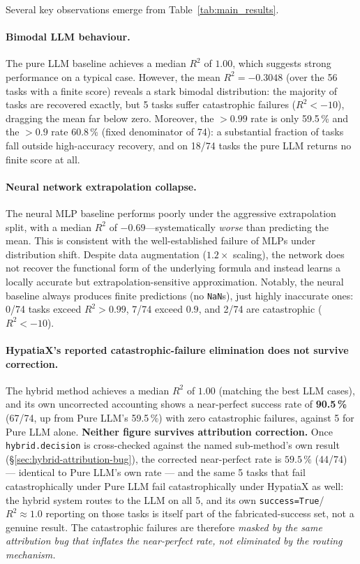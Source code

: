 \documentclass[twoside,11pt]{article}
\newcommand{\Rsq}{R^{2}}
\begin{document}
Several key observations emerge from Table~\ref{tab:main_results}.

\paragraph{Bimodal LLM behaviour.}
The pure LLM baseline achieves a median $\Rsq$ of $1.00$, which suggests strong
performance on a typical case.  However, the mean $\Rsq = -0.3048$ (over the 56 tasks with a finite score) reveals a
stark bimodal distribution: the majority of tasks are recovered exactly, but
5 tasks suffer catastrophic failures ($\Rsq < -10$), dragging the mean far below
zero.  Moreover, the $>0.99$ rate is only 59.5\,\% and the $>0.9$ rate 60.8\,\% (fixed
denominator of 74): a substantial fraction of tasks fall outside high-accuracy
recovery, and on 18/74 tasks the pure LLM returns no finite score at all.

\paragraph{Neural network extrapolation collapse.}
The neural MLP baseline performs poorly under the aggressive extrapolation split,
with a median $\Rsq$ of $-0.69$---systematically \emph{worse} than predicting
the mean.  This is consistent with the well-established failure of MLPs under
distribution shift.  Despite data augmentation ($1.2\times$ scaling), the network
does not recover the functional form of the underlying formula and instead learns
a locally accurate but extrapolation-sensitive approximation.  Notably, the neural
baseline always produces finite predictions (no \texttt{NaN}s), just highly
inaccurate ones: 0/74 tasks exceed $\Rsq>0.99$, 7/74 exceed $0.9$, and 2/74 are
catastrophic ($\Rsq<-10$).

\paragraph{HypatiaX's reported catastrophic-failure elimination does not survive
correction.} The hybrid method achieves a median $\Rsq$ of $1.00$ (matching the
best LLM cases), and its own uncorrected accounting shows a near-perfect success
rate of \textbf{90.5\,\%} (67/74, up from Pure LLM's 59.5\,\%) with zero
catastrophic failures, against 5 for Pure LLM alone. \textbf{Neither figure
survives attribution correction.} Once \texttt{hybrid.decision} is
cross-checked against the named sub-method's own result
(\S\ref{sec:hybrid-attribution-bug}), the corrected near-perfect rate is
$59.5\,\%$ (44/74) --- identical to Pure LLM's own rate --- and the same 5
tasks that fail catastrophically under Pure LLM fail catastrophically under
HypatiaX as well: the hybrid system routes to the LLM on all 5, and its own
\texttt{success=True}/$\Rsq\approx 1.0$ reporting on those tasks is itself
part of the fabricated-success set, not a genuine result. The catastrophic
failures are therefore \emph{masked by the same attribution bug that
inflates the near-perfect rate, not eliminated by the routing mechanism.}
\end{document}
